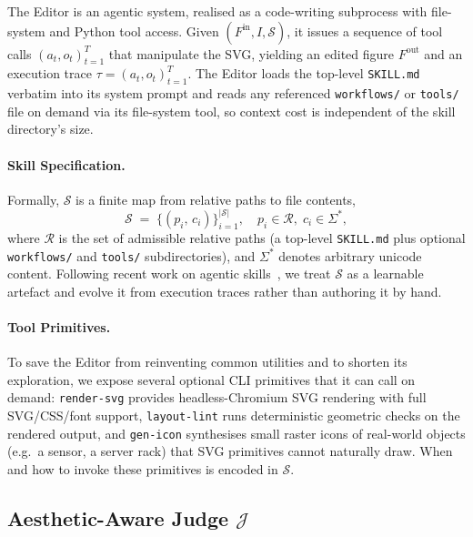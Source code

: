 \documentclass[11pt]{article}
\begin{document}
The Editor is an agentic system, realised as a code-writing
subprocess with file-system and Python tool access.  Given
$(F^{\mathrm{in}}, I, \mathcal{S})$, it issues a sequence of tool
calls $(a_t, o_t)_{t=1}^{T}$ that manipulate the SVG, yielding an
edited figure $F^{\mathrm{out}}$ and an execution trace
$\tau=(a_t, o_t)_{t=1}^{T}$.  The Editor loads the top-level
\texttt{SKILL.md} verbatim into its system prompt and reads any
referenced \texttt{workflows/} or \texttt{tools/} file on demand
via its file-system tool, so context cost is independent of
the skill directory's size.

\paragraph{Skill Specification.}
Formally, $\mathcal{S}$ is a finite map from relative paths to file
contents,
\begin{equation}
\label{eq:skill}
\mathcal{S} \;=\; \big\{(p_i,\, c_i)\big\}_{i=1}^{|\mathcal{S}|}, \quad p_i\!\in\!\mathcal{R},\; c_i\!\in\!\Sigma^{\ast},
\end{equation}
where $\mathcal{R}$ is the set of admissible relative paths (a
top-level \texttt{SKILL.md} plus optional \texttt{workflows/} and
\texttt{tools/} subdirectories), and $\Sigma^{\ast}$ denotes
arbitrary unicode content.  Following recent work on agentic
skills~\citep{alzubi2026evoskill, ni2026trace2skill}, we treat
$\mathcal{S}$ as a learnable artefact and evolve it from execution
traces rather than authoring it by hand.

\paragraph{Tool Primitives.}
To save the Editor from reinventing common utilities and to
shorten its exploration, we expose several optional CLI primitives
that it can call on demand: \texttt{render-svg} provides
headless-Chromium SVG rendering with full SVG/CSS/font support,
\texttt{layout-lint} runs deterministic geometric checks on the
rendered output, and \texttt{gen-icon} synthesises small raster
icons of real-world objects (e.g.\ a sensor, a server rack) that
SVG primitives cannot naturally draw.  When and how to invoke
these primitives is encoded in $\mathcal{S}$.

\subsection{Aesthetic-Aware Judge $\mathcal{J}$}
\label{sec:judge}
\end{document}
